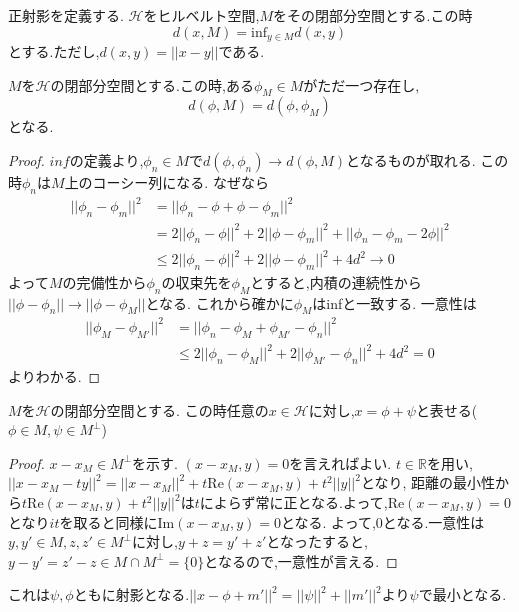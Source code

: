 \documentclass[uplatex]{jsbook}
\begin{document}
正射影を定義する.
$\mathcal{H}$をヒルベルト空間,$M$をその閉部分空間とする.この時
\begin{equation*}
d(x, M) = \mathrm{inf}_{y\in M}d(x,y)
\end{equation*}
とする.ただし,$d(x,y) = ||x -y||$である.

\begin{prop}
 $M$を$\mathcal{H}$の閉部分空間とする.この時,ある$\phi_M \in M$がただ一つ存在し,
 \begin{equation*}
  d(\phi, M) = d(\phi, \phi_M)
 \end{equation*}
となる.
\end{prop}
\begin{proof}
$inf$の定義より,$\phi_n \in M$で$d(\phi, \phi_n) \to d(\phi, M)$となるものが取れる.
この時$\phi_n$は$M$上のコーシー列になる.
なぜなら
\begin{align*}
||\phi_n - \phi_m||^2 & = ||\phi_n - \phi + \phi - \phi_m ||^2 \\
                      & = 2||\phi_n - \phi||^2 + 2 ||\phi - \phi_m||^2 + ||\phi_n - \phi_m - 2\phi||^2 \\
                      & \le 2||\phi_n - \phi||^2 + 2 ||\phi - \phi_m||^2 + 4d^2  \to 0
\end{align*}
よって$M$の完備性から$\phi_n$の収束先を$\phi_M$とすると,内積の連続性から$||\phi - \phi_n|| \to ||\phi - \phi_M ||$となる.
これから確かに$\phi_M$はinfと一致する.
一意性は
\begin{align*}
||\phi_M - \phi_{M'}||^2 & = ||\phi_n - \phi_M + \phi_{M'} - \phi_n ||^2 \\
                         & \le 2||\phi_n - \phi_M||^2 + 2 ||\phi_{M'} - \phi_n||^2 + 4d^2 = 0
\end{align*}
よりわかる.
\end{proof}

\begin{thm}[正射影定理]
$M$を$\mathcal{H}$の閉部分空間とする.
この時任意の$x \in \mathcal{H}$に対し,$x = \phi + \psi$と表せる($\phi \in M, \psi \in M^{\perp}$)
\end{thm}
\begin{proof}
$x - x_M \in M^{\perp}$を示す.
$(x - x_M, y) = 0$を言えればよい.
$t \in \mathbb{R}$を用い,$||x - x_M - ty||^2 = ||x - x_M||^2 + t\mathrm{Re}(x - x_M, y) + t^2 ||y||^2$となり,
距離の最小性から$t\mathrm{Re}(x - x_M, y) + t^2 ||y||^2$は$t$によらず常に正となる.よって,$\mathrm{Re}(x - x_M, y) = 0$となり$it$を取ると同様に$\mathrm{Im}(x - x_M, y) = 0$となる.
よって,0となる.一意性は$y,y' \in M, z, z' \in M^{\perp}$に対し,$y + z = y' + z'$となったすると,$y - y' = z' -z \in M \cap M^{\perp} = \{0\}$となるので,一意性が言える.
\end{proof}
これは$\psi, \phi$ともに射影となる.$||x -  \phi + m'||^2 =  ||\psi||^2 + ||m'||^2$より$\psi$で最小となる.
\end{document}
